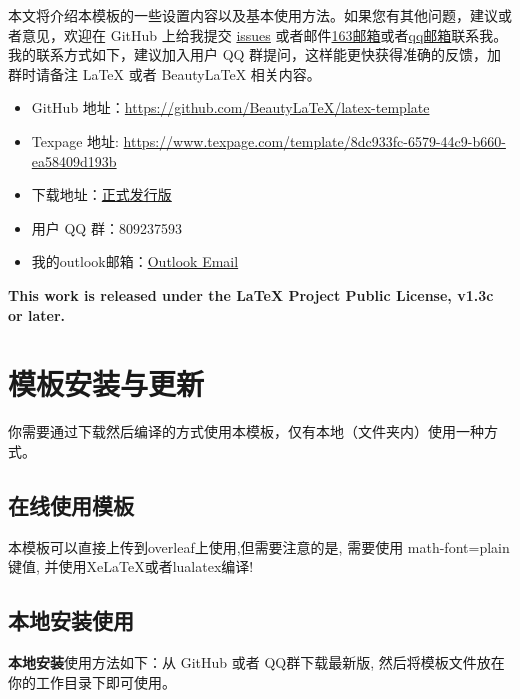 \documentclass[lang=cn,zihao=-4,a4paper,fontset=windows]{beautybook}
\begin{document}
本文将介绍本模板的一些设置内容以及基本使用方法。如果您有其他问题，建议或者意见，欢迎在 GitHub 上给我提交 \href{https://github.com/BeautyLaTeX/latex-template/issues}{issues} 或者邮件\href{h1479840692@163.com}{163邮箱}或者\href{1479840692@qq.com}{qq邮箱}联系我。我的联系方式如下，建议加入用户 QQ 群提问，这样能更快获得准确的反馈，加群时请备注 \LaTeX{} 或者 Beauty\LaTeX{} 相关内容。
\begin{itemize}
  \item GitHub 地址：\href{https://github.com/BeautyLaTeX/latex-template}{https://github.com/BeautyLaTeX/latex-template}
  \item Texpage 地址: \href{https://www.texpage.com/template/8dc933fc-6579-44c9-b660-ea58409d193b}{https://www.texpage.com/template/8dc933fc-6579-44c9-b660-ea58409d193b}
  \item 下载地址：\href{https://github.com/BeautyLaTeX/latex-template/releases}{正式发行版}
  \item 用户 QQ 群：809237593
  \item 我的outlook邮箱：\href{https://h1479840692@outlook.com}{Outlook Email}
\end{itemize}
\textbf{This work is released under the LaTeX Project Public License, v1.3c or later.}

\section{模板安装与更新}

你需要通过下载然后编译的方式使用本模板，仅有本地（文件夹内）使用一种方式。

\subsection{在线使用模板}
本模板可以直接上传到overleaf上使用,但需要注意的是, 需要使用 math-font=plain 键值, 并使用XeLaTeX或者lualatex编译!
\newpage
\subsection{本地安装使用}

\textbf{本地安装}使用方法如下：从 GitHub 或者 QQ群下载最新版, 然后将模板文件放在你的工作目录下即可使用。
\end{document}
